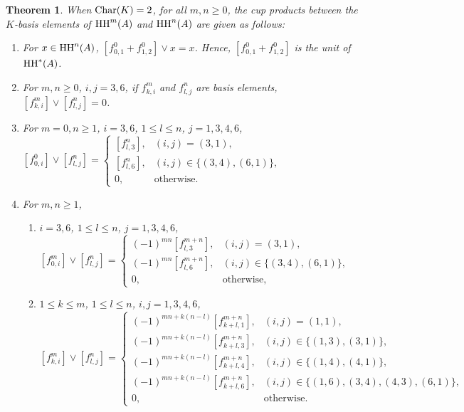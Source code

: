 \documentclass[10pt, reqno]{amsart}
\newtheorem{theorem}{Theorem}[section]
\theoremstyle{definition}
\theoremstyle{remark}
\numberwithin{equation}{section}
\begin{document}
\begin{theorem} \label{thm: char 2 cup product}
    When \(\mathrm{Char}(K)=2\), for all \(m,n\ge0\), the cup products between the \(K\)-basis elements of $\mathrm{HH}^m(A)$ and $\mathrm{HH}^n(A)$ are given as follows: 
    \begin{enumerate}
          \item  For $x\in \mathrm{HH}^n(A)$, $[f_{0,1}^0+f_{1,2}^0]\lor x=x$. Hence, $[f_{0,1}^0+f_{1,2}^0]$ is the unit of $\mathrm{HH}^*(A)$.
        \item For $m, n\ge 0$, \(i,j=3,6\), if \(f_{k,i}^m\) and \(f_{l,j}^n\) are basis elements, $[f_{k,i}^m]\lor[f_{l,j}^n]=0$.
        \item For \( m=0, n\ge 1\), \(i=3,6\), \(1\le l\le n\), \(j=1,3,4,6\), \([f_{0,i}^0]\lor [f_{l,j}^n]=
                        \begin{cases}
                            [f_{l,3}^n], & (i,j)=(3,1),\\
                            [f_{l,6}^n], & (i,j) \in \{(3,4), (6,1)\},\\
                           0, & \text{otherwise}.
                         \end{cases}\)

        \item For \(m,n\ge 1\),
            \begin{enumerate}
                \item \(i=3,6\), \(1\le l\le n\), \(j=1,3,4,6\), \([f_{0,i}^m]\lor [f_{l,j}^n]=
                    \begin{cases}
(-1)^{mn}[f_{l,3}^{m+n}], & (i,j)=(3,1),\\
(-1)^{mn}[f_{l,6}^{m+n}], & (i,j) \in \{(3,4), (6,1)\},\\
0, & \text{otherwise},
                    \end{cases}\)
                \item  \(1\le k\le m\), \(1\le l\le n\), \(i,j=1,3,4,6\), \\
                 \([f_{k,i}^m]\lor [f_{l,j}^n]=
\begin{cases}
(-1)^{mn+k(n-l)}[f_{k+l,1}^{m+n}], & (i,j)=(1,1),\\
(-1)^{mn+k(n-l)}[f_{k+l,3}^{m+n}], & (i,j) \in \{(1,3), (3,1)\},\\
(-1)^{mn+k(n-l)}[f_{k+l,4}^{m+n}], & (i,j) \in \{(1,4), (4,1)\},\\
(-1)^{mn+k(n-l)}[f_{k+l,6}^{m+n}], & (i,j) \in \{(1,6), (3,4), (4,3), (6,1)\},\\
0, & \text{otherwise}.
\end{cases}\)
            \end{enumerate}
    \end{enumerate}
\end{theorem}
\end{document}
